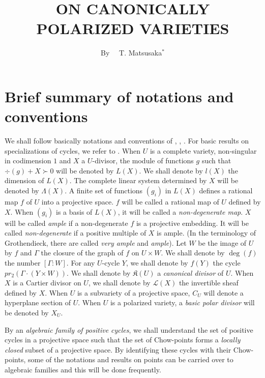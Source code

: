 \title{ON CANONICALLY POLARIZED VARIETIES}

\author{By~~ T. Matsusaka$^{*}$}

\date{}

\maketitle

\setcounter{pageoriginal}{264}
\section*{Brief summary of notations and conventions}
\pageoriginale

We shall follow basically notations and conventions of \cite{art14-key21}, \cite{art14-key25}, \cite{art14-key32}. For basic results on specializations of cycles, we refer to \cite{art14-key24}. When $U$ is a complete variety, non-singular in codimension $1$ and $X$ a $U$-divisor, the module of functions $g$ such that $\div (g)+X\succ 0$ will be denoted by $L(X)$. We shall denote by $l(X)$ the dimension of $L(X)$. The complete linear system determined by $X$ will be denoted by $\Lambda(X)$. A finite set of functions $(g_{i})$ in $L(X)$ defines a rational map $f$ of $U$ into a projective space. $f$ will be called a {\rm rational map of $U$ defined by $X$.} When $(g_{i})$ is a basis of $L(X)$, it will be called a {\em non-degenerate map}. $X$ will be called {\em ample} if a non-degenerate $f$ is a projective embedding. It will be called {\em non-degenerate} if a positive multiple of $X$ is ample. (In the terminology of Grothendieck, there are called {\em very ample} and {\em ample}). Let $W$ be the image of $U$ by $f$ and $\Gamma$ the closure of the graph of $f$ on $U\times W$. We shall denote by $\deg (f)$ the number $[\Gamma:W]$. For any $U$-cycle $Y$, we shall denote by $f(Y)$ the cycle $pr_{2}(\Gamma\cdot (Y\times W))$. We shall denote by $\mathfrak{K}(U)$  a {\em canonical divisor} of $U$. When $X$ is a Cartier divisor on $U$, we shall denote by $\mathscr{L}(X)$ the invertible sheaf defined by $X$. When $U$ is a subvariety of a projective space, $C_{U}$ will denote a hyperplane section of $U$. When $U$ is a polarized variety, a {\em basic polar divisor} will be denoted by $X_{U}$.

By an {\em algebraic family of positive cycles}, we shall understand the set of positive cycles in a projective space such that the set of Chow-points forms a {\em locally closed} subset of a projective space. By identifying these cycles with their Chow-points, some of the notations and results on points can be carried over to algebraic families and this will be done frequently.


